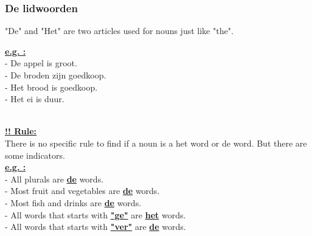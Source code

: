 \documentclass[a4paper,14pt]{extarticle}
\newcommand{\attention}[1]{\underline{\textbf{!! #1}}}
\newcommand{\emp}[1]{\underline{\textbf{#1}}}
\begin{document}
\subsubsection{De lidwoorden}
"De" and "Het" are two articles used for nouns just like "the". \\
\begin{paracol}{2}
\emp{e.g. : } \hfill \\
- De appel is groot. \\
- De broden zijn goedkoop.
\switchcolumn
\hfill \\
- Het brood is goedkoop. \\
- Het ei is duur.
\end{paracol}
\hfill \\
\attention{Rule:} \\
There is no specific rule to find if a noun is a het word or de word. But there are some indicators. \\
\emp{e.g. : } \\
- All plurals are \emp{de} words. \\
- Most fruit and vegetables are \emp{de} words. \\
- Most fish and drinks are \emp{de} words. \\
- All words that starts with \emp{"ge"} are \emp{het} words. \\
- All words that starts with \emp{"ver"} are \emp{de} words. \\
\end{document}
